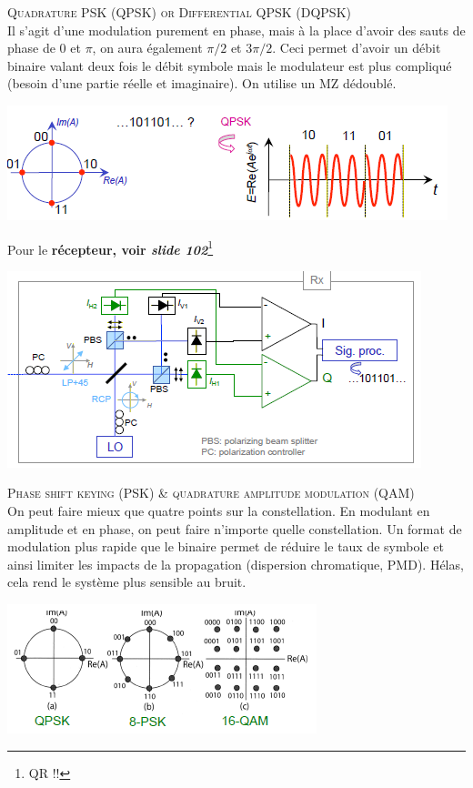 \textsc{Quadrature PSK (QPSK) or Differential QPSK (DQPSK)}\\
Il s'agit d'une modulation purement en phase, mais à la place d'avoir des sauts de phase de 0 et
$\pi$, on aura également $\pi/2$ et $3\pi/2$. Ceci permet d'avoir un débit binaire valant deux fois
le débit symbole mais le modulateur est plus compliqué (besoin d'une partie réelle et imaginaire). 
On utilise un MZ dédoublé. 
\begin{center}
	\includegraphics[scale=0.65]{ch6/image43}
\end{center}
Pour le \textbf{récepteur, voir \textit{slide 102}}\footnote{QR !!}\\
\begin{center}
	\includegraphics[scale=0.65]{ch6/image44}
\end{center}

\textsc{Phase shift keying (PSK) \& quadrature amplitude modulation (QAM)}\\
On peut faire mieux que quatre points sur la constellation. En modulant en amplitude et en phase,
on peut faire n'importe quelle constellation. Un format de modulation plus rapide que le binaire
permet de réduire le taux de symbole et ainsi limiter les impacts de la propagation (dispersion
chromatique, PMD). Hélas, cela rend le système plus sensible au bruit.
\begin{center}
	\includegraphics[scale=0.65]{ch6/image45}
\end{center}



